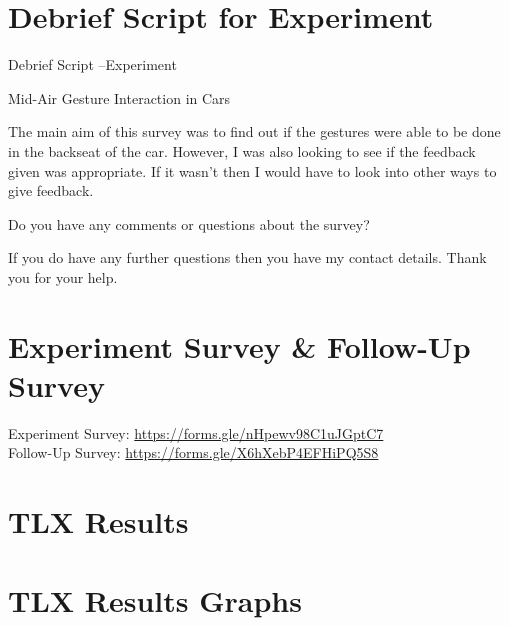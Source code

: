 \documentclass{l4proj}
\begin{document}
\begin{appendices}
\section{Debrief Script for Experiment}
\label{section:debriefExp}
Debrief Script –Experiment

Mid-Air Gesture Interaction in Cars

The main aim of this survey was to find out if the gestures were able to be done in the backseat of the car. However, I was also looking to see if the feedback given was appropriate. If it wasn't then I would have to look into other ways to give feedback.

Do you have any comments or questions about the survey?

If you do have any further questions then you have my contact details. Thank you for your help.

\section{Experiment Survey \& Follow-Up Survey}
\label{section:expSurvey}
Experiment Survey: \url{https://forms.gle/nHpewv98C1uJGptC7}\\
Follow-Up Survey: \url{https://forms.gle/X6hXebP4EFHiPQ5S8}


\section{TLX Results}
\label{section:TLXResults}



\section{TLX Results Graphs}
\label{section:TLXGraphs}


\end{appendices}





\renewcommand{\thechapter}{0} 

\end{document}
